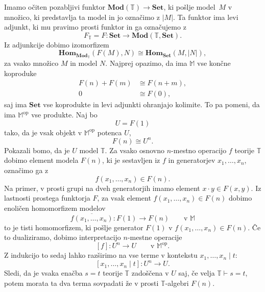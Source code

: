 \documentclass[../kategoricna_logika.tex]{subfiles}
\begin{document}
\begin{dokaz}
  Imamo očiten pozabljivi funktor
  $\mathbf{Mod}(\mathbb{T}) \to \mathbf{Set}$, ki pošlje model~$M$ v
  množico, ki predstavlja ta model in jo označimo z $|M|$.  Ta funktor
  ima levi adjunkt, ki mu pravimo prosti funktor in ga označujemo z
  \[ F_{\mathbb{T}} = F : \mathbf{Set} \to \mathbf{Mod}(\mathbb{T},
    \mathbf{Set}). \]
  Iz adjunkcije dobimo izomorfizem
  \[ \mathbf{Hom}_{\mathbf{Mod}_{\mathbb{T}}}(F(M), N) \cong
    \mathbf{Hom}_{\mathbf{Set}}(M, |N|),\] za vsako množico $M$ in
  model $N$.  Najprej opazimo, da ima $\mathbb{M}$ vse končne
  koproduke
  \begin{align*}
    F(n) + F(m) &\cong F(n + m), \\
    0 &\cong F(0),
  \end{align*}
  saj ima $\mathbf{Set}$ vse koprodukte in levi adjunkti ohranjajo kolimite.
  To pa pomeni, da ima $\mathbb{M}^{\mathrm{op}}$ vse produkte. Naj bo
  \[ U = F(1) \]
  tako, da je vsak objekt v $\mathbb{M}^{\mathrm{op}}$ potenca $U$,
  \[ F(n) \cong U^n.\]
  Pokazali bomo, da je $U$ model $\mathbb{T}$.
  Za vsako osnovno $n$-mestno operacijo $f$ teorije $\mathbb{T}$ dobimo element modela
  $F(n)$, ki je sestavljen iz $f$ in generatorjev $x_1, \ldots, x_n$, označimo ga z
  \[ f(x_1, \ldots, x_n) \in F(n).\]
  Na primer, v prosti grupi na dveh generatorjih imamo element $x \cdot y \in F(x,y)$.
  Iz lastnosti prostega funktorja $F$, za vsak element $f(x_1, \ldots, x_n) \in F(n)$
  dobimo enoličen homomorfizem modelov
  \[ \overline{f(x_1, \ldots, x_n)} : F(1) \to F(n) \qquad \text{v $\mathbb{M}$}\]
  to je tisti homomorfizem, ki pošlje generator $F(1)$ v $f(x_1, \ldots, x_n) \in F(n)$.
  Če to dualiziramo, dobimo interpretacijo $n$-mestne operacije
  \[ [f] : U^n \to U \qquad \text{v $\mathbb{M}^{\mathrm{op}}$}.\]
  Z indukcijo to sedaj lahko razširimo na vse terme v kontekstu $x_1, \ldots, x_n \mid t$:
  \[ [x_{1}, \ldots, x_n \mid t] : U^n \to U.\]
  Sledi, da je vsaka enačba $s = t$ teorije $\mathbb{T}$ zadoščena v $U$
  saj, če velja $\mathbb{T} \vdash s = t$, potem morata ta dva terma sovpadati
  že v prosti $\mathbb{T}$-algebri $F(n)$.


\end{dokaz}
\end{document}
